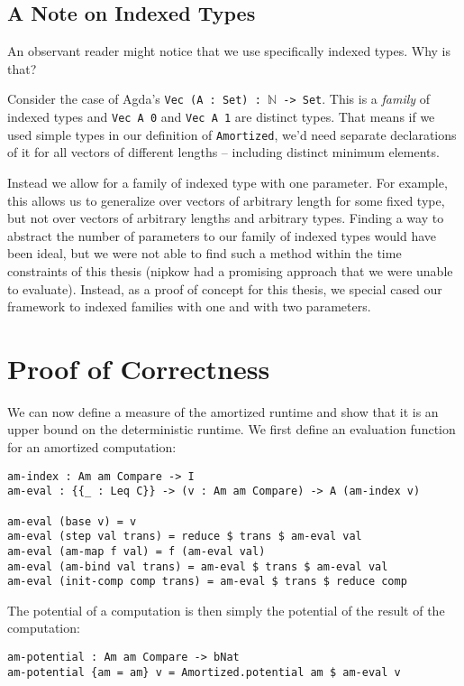 \subsection{A Note on Indexed Types}
An observant reader might notice that we use specifically indexed types. Why is that?

Consider the case of Agda's \texttt{Vec (A : Set) : $\mathbb N$ -> Set}. This is a \emph{family} of indexed types and \texttt{Vec A 0} and \texttt{Vec A 1} are distinct types. That means if we used simple types in our definition of \texttt{Amortized}, we'd need separate declarations of it for all vectors of different lengths -- including distinct minimum elements.

Instead we allow for a family of indexed type with one parameter. For example, this allows us to generalize over vectors of arbitrary length for some fixed type, but not over vectors of arbitrary lengths and arbitrary types. Finding a way to abstract the number of parameters to our family of indexed types would have been ideal, but we were not able to find such a method within the time constraints of this thesis (nipkow  had a promising approach that we were unable to evaluate). Instead, as a proof of concept for this thesis, we special cased our framework to indexed families with one and with two parameters.

\section{Proof of Correctness}
We can now define a measure of the amortized runtime and show that it is an upper bound on the deterministic runtime. We first define an evaluation function for an amortized computation:

\begin{lstlisting}[caption={Evaluating amortized computations},label={lst:amortized:framework:eval},emph={am,index,eval}]
am-index : Am am Compare -> I
am-eval : {{_ : Leq C}} -> (v : Am am Compare) -> A (am-index v)

am-eval (base v) = v
am-eval (step val trans) = reduce $ trans $ am-eval val
am-eval (am-map f val) = f (am-eval val)
am-eval (am-bind val trans) = am-eval $ trans $ am-eval val
am-eval (init-comp comp trans) = am-eval $ trans $ reduce comp
\end{lstlisting}

The potential of a computation is then simply the potential of the result of the computation:

\begin{lstlisting}[caption={Potential of a computation},label={lst:amortized:framework:pot},emph={am,potential}]
am-potential : Am am Compare -> bNat
am-potential {am = am} v = Amortized.potential am $ am-eval v
\end{lstlisting}

